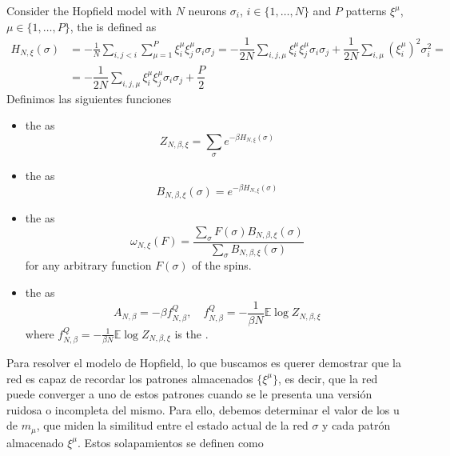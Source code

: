 \begin{definicion}
    Consider the Hopfield model with $N$ neurons $\sigma_i$, $i \in \{1, \ldots, N\}$ and $P$ patterns $\xi^\mu$, $\mu \in \{1, \ldots, P\}$, the  is defined as
    \begin{align*}
        H_{N,\xi}(\sigma) &= -\frac{1}{N} \sum_{i,j<i} \sum_{\mu=1}^{P} \xi_i^\mu \xi_j^\mu \sigma_i \sigma_j=-\dfrac{1}{2N} \sum_{i,j,\mu} \xi_i^\mu \xi_j^\mu \sigma_i \sigma_j + \dfrac{1}{2N} \sum_{i,\mu} \left(\xi_i^\mu\right)^2\sigma_i^2=\\
        &= -\dfrac{1}{2N} \sum_{i,j,\mu} \xi_i^\mu \xi_j^\mu \sigma_i \sigma_j +\dfrac{P}{2}
    \end{align*}
    Definimos las siguientes funciones 
    \begin{itemize}
        \item the  as
        \begin{equation*}
            Z_{N,\beta,\xi} = \sum_{\sigma} e^{-\beta H_{N,\xi}(\sigma)}
        \end{equation*}
        \item the  as
        \begin{equation*}
            B_{N,\beta,\xi}(\sigma) = e^{-\beta H_{N,\xi}(\sigma)}
        \end{equation*}
        \item the  as
        \begin{equation*}
            \omega_{N,\xi}(F) = \frac{\sum_{\sigma} F(\sigma) B_{N,\beta,\xi}(\sigma)}{\sum_{\sigma} B_{N,\beta,\xi}(\sigma)}
        \end{equation*}
        for any arbitrary function $F(\sigma)$ of the spins.
        \item the  as
        \begin{equation*}
            A_{N,\beta} = -\beta f_{N,\beta}^Q, \quad f_{N,\beta}^Q = -\frac{1}{\beta N} \mathbb{E} \log Z_{N,\beta,\xi}
        \end{equation*}
        where $f_{N,\beta}^Q= - \frac{1}{\beta N} \mathbb{E} \log Z_{N,\beta,\xi}$ is the . \\
    \end{itemize}
\end{definicion}
\noindent
Para resolver el modelo de Hopfield, lo que buscamos es querer demostrar que la red es capaz de recordar los patrones almacenados $\{\xi^\mu\}$, es decir, que la red puede converger a uno de estos patrones cuando se le presenta una versión ruidosa o incompleta del mismo. Para ello, debemos determinar el valor de los  u  de  $m_\mu$, que miden la similitud entre el estado actual de la red $\sigma$ y cada patrón almacenado $\xi^\mu$. Estos solapamientos se definen como
